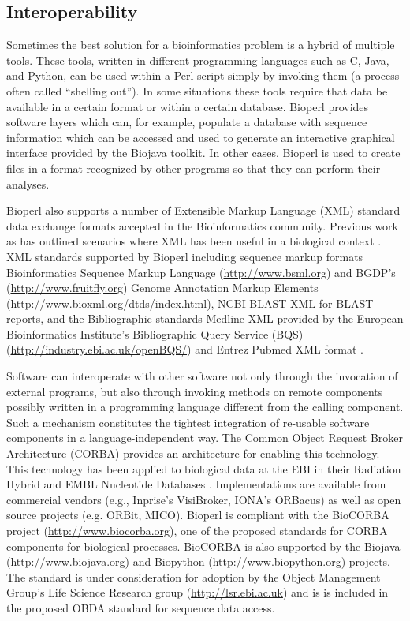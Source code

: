 \documentclass[12pt]{article}
\begin{document}
\subsection{Interoperability}

Sometimes the best solution for a bioinformatics problem is a hybrid
of multiple tools.  These tools, written in different programming
languages such as C, Java, and Python, can be used within a Perl
script simply by invoking them (a process often called ``shelling
out'').  In some situations these tools require that data be available
in a certain format or within a certain database.  Bioperl provides
software layers which can, for example, populate a database with
sequence information which can be accessed and used to generate an
interactive graphical interface provided by the Biojava toolkit.
In other cases, Bioperl is used to create files in a format recognized
by other programs so that they can perform their analyses. 

Bioperl also supports a number of Extensible Markup Language (XML) 
standard data exchange formats accepted in the Bioinformatics
community.  Previous work as has outlined scenarios
where XML has been useful in a biological context
\cite{xmlbioinformatics}.  XML standards supported by Bioperl
including sequence markup formats Bioinformatics Sequence Markup
Language (\url{http://www.bsml.org}) and BGDP's
(\url{http://www.fruitfly.org}) Genome Annotation Markup Elements
(\url{http://www.bioxml.org/dtds/index.html}), NCBI BLAST XML for
BLAST reports, and the Bibliographic standards Medline XML provided
by the European Bioinformatics Institute's Bibliographic 
Query Service (BQS) (\url{http://industry.ebi.ac.uk/openBQS/}) and 
Entrez Pubmed XML format \cite{entrez}.

Software can interoperate with other software not only through the
invocation of external programs, but also through invoking methods on
remote components possibly written in a programming language different
from the calling component.  Such a mechanism constitutes the tightest
integration of re-usable software components in a language-independent
way.  The Common Object Request Broker Architecture (CORBA)
\cite{corba} provides an architecture for enabling this technology.
This technology has been applied to biological data at the EBI in
their Radiation Hybrid \cite{rhdb} and EMBL Nucleotide Databases
\cite{embl-corba}.  Implementations are available from commercial
vendors (e.g., Inprise's VisiBroker, IONA's ORBacus) as well as open
source projects (e.g. ORBit, MICO).  Bioperl is compliant with the
BioCORBA project (\url{http://www.biocorba.org}), one of the proposed
standards for CORBA components for biological processes.  BioCORBA is
also supported by the Biojava (\url{http://www.biojava.org}) and
Biopython (\url{http://www.biopython.org}) projects.  The standard is
under consideration for adoption by the Object Management Group's Life
Science Research group (\url{http://lsr.ebi.ac.uk}) and is is included
in the proposed OBDA standard for sequence data access.
\end{document}
